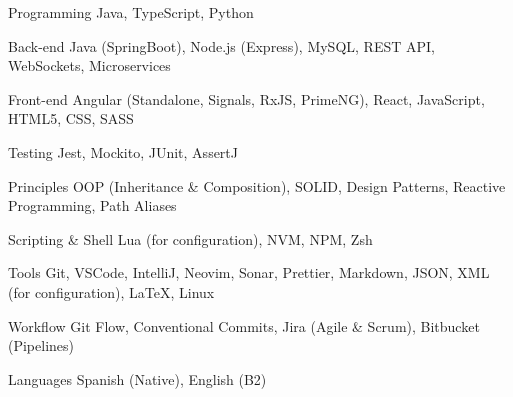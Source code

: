 

\begin{cvskills}

  \cvskill
    {Programming} %
    {Java, TypeScript, Python} %

  \cvskill
    {Back-end} %
    {Java (SpringBoot), Node.js (Express), MySQL, REST API, WebSockets, Microservices} %

  \cvskill
    {Front-end} %
    {Angular (Standalone, Signals, RxJS, PrimeNG), React, JavaScript, HTML5, CSS, SASS} %

  \cvskill
    {Testing} %
    {Jest, Mockito, JUnit, AssertJ} %

  \cvskill
    {Principles} %
    {OOP (Inheritance \& Composition), SOLID, Design Patterns, Reactive Programming, Path Aliases} %

  \cvskill
    {Scripting \& Shell} %
    {Lua (for configuration), NVM, NPM, Zsh} %

\cvskill
    {Tools} %
    {Git, VSCode, IntelliJ, Neovim, Sonar, Prettier, Markdown, JSON, XML (for configuration), LaTeX, Linux} %

  \cvskill
    {Workflow} %
    {Git Flow, Conventional Commits, Jira (Agile \& Scrum), Bitbucket (Pipelines)} %

  \cvskill
    {Languages} %
    {Spanish (Native), English (B2)} %

\end{cvskills}

